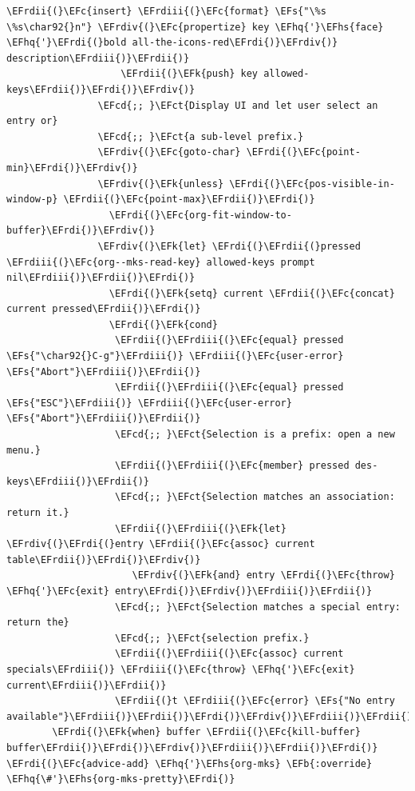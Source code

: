\documentclass{scrartcl}
\newcommand{\EFk}[1]{\textcolor{EFk}{#1}} %
\newcommand{\EFs}[1]{\textcolor{EFs}{#1}} %
\newcommand{\EFb}[1]{\textcolor{EFb}{#1}} %
\newcommand{\EFct}[1]{\textcolor{EFct}{#1}} %
\newcommand{\EFc}[1]{\textcolor{EFc}{#1}} %
\newcommand{\EFcd}[1]{\textcolor{EFcd}{#1}} %
\newcommand{\EFhq}[1]{\textcolor{EFhq}{#1}} %
\newcommand{\EFhs}[1]{\textcolor{EFhs}{#1}} %
\newcommand{\EFrdi}[1]{\textcolor{EFrdi}{#1}} %
\newcommand{\EFrdii}[1]{\textcolor{EFrdii}{#1}} %
\newcommand{\EFrdiii}[1]{\textcolor{EFrdiii}{#1}} %
\newcommand{\EFrdiv}[1]{\textcolor{EFrdiv}{#1}} %
\begin{document}
\begin{Code}
\begin{Verbatim}[]
                    \EFrdii{(}\EFc{insert} \EFrdiii{(}\EFc{format} \EFs{"\%s   \%s\char92{}n"} \EFrdiv{(}\EFc{propertize} key \EFhq{'}\EFhs{face} \EFhq{'}\EFrdi{(}bold all-the-icons-red\EFrdi{)}\EFrdiv{)} description\EFrdiii{)}\EFrdii{)}
                    \EFrdii{(}\EFk{push} key allowed-keys\EFrdii{)}\EFrdi{)}\EFrdiv{)}
                \EFcd{;; }\EFct{Display UI and let user select an entry or}
                \EFcd{;; }\EFct{a sub-level prefix.}
                \EFrdiv{(}\EFc{goto-char} \EFrdi{(}\EFc{point-min}\EFrdi{)}\EFrdiv{)}
                \EFrdiv{(}\EFk{unless} \EFrdi{(}\EFc{pos-visible-in-window-p} \EFrdii{(}\EFc{point-max}\EFrdii{)}\EFrdi{)}
                  \EFrdi{(}\EFc{org-fit-window-to-buffer}\EFrdi{)}\EFrdiv{)}
                \EFrdiv{(}\EFk{let} \EFrdi{(}\EFrdii{(}pressed \EFrdiii{(}\EFc{org--mks-read-key} allowed-keys prompt nil\EFrdiii{)}\EFrdii{)}\EFrdi{)}
                  \EFrdi{(}\EFk{setq} current \EFrdii{(}\EFc{concat} current pressed\EFrdii{)}\EFrdi{)}
                  \EFrdi{(}\EFk{cond}
                   \EFrdii{(}\EFrdiii{(}\EFc{equal} pressed \EFs{"\char92{}C-g"}\EFrdiii{)} \EFrdiii{(}\EFc{user-error} \EFs{"Abort"}\EFrdiii{)}\EFrdii{)}
                   \EFrdii{(}\EFrdiii{(}\EFc{equal} pressed \EFs{"ESC"}\EFrdiii{)} \EFrdiii{(}\EFc{user-error} \EFs{"Abort"}\EFrdiii{)}\EFrdii{)}
                   \EFcd{;; }\EFct{Selection is a prefix: open a new menu.}
                   \EFrdii{(}\EFrdiii{(}\EFc{member} pressed des-keys\EFrdiii{)}\EFrdii{)}
                   \EFcd{;; }\EFct{Selection matches an association: return it.}
                   \EFrdii{(}\EFrdiii{(}\EFk{let} \EFrdiv{(}\EFrdi{(}entry \EFrdii{(}\EFc{assoc} current table\EFrdii{)}\EFrdi{)}\EFrdiv{)}
                      \EFrdiv{(}\EFk{and} entry \EFrdi{(}\EFc{throw} \EFhq{'}\EFc{exit} entry\EFrdi{)}\EFrdiv{)}\EFrdiii{)}\EFrdii{)}
                   \EFcd{;; }\EFct{Selection matches a special entry: return the}
                   \EFcd{;; }\EFct{selection prefix.}
                   \EFrdii{(}\EFrdiii{(}\EFc{assoc} current specials\EFrdiii{)} \EFrdiii{(}\EFc{throw} \EFhq{'}\EFc{exit} current\EFrdiii{)}\EFrdii{)}
                   \EFrdii{(}t \EFrdiii{(}\EFc{error} \EFs{"No entry available"}\EFrdiii{)}\EFrdii{)}\EFrdi{)}\EFrdiv{)}\EFrdiii{)}\EFrdii{)}\EFrdi{)}
        \EFrdi{(}\EFk{when} buffer \EFrdii{(}\EFc{kill-buffer} buffer\EFrdii{)}\EFrdi{)}\EFrdiv{)}\EFrdiii{)}\EFrdii{)}\EFrdi{)}
\EFrdi{(}\EFc{advice-add} \EFhq{'}\EFhs{org-mks} \EFb{:override} \EFhq{\#'}\EFhs{org-mks-pretty}\EFrdi{)}
\end{Verbatim}
\end{Code}
\end{document}
